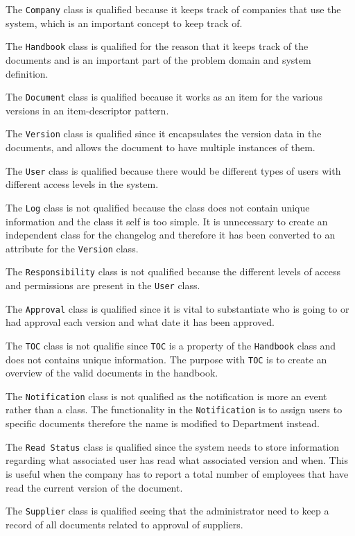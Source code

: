 The \texttt{Company} class is qualified because it keeps track of companies that use the system, which is an important concept to keep track of.

The \texttt{Handbook} class is qualified for the reason that it keeps track of the documents and is an important part of the problem domain and system definition.

The \texttt{Document} class is qualified because it works as an item for the various versions in an item-descriptor pattern.

The \texttt{Version} class is qualified since it encapsulates the version data in the documents, and allows the document to have multiple instances of them.

The \texttt{User} class is qualified because there would be different types of users with different access levels in the system.

The \texttt{Log} class is not qualified because the class does not contain unique information and the class it self is too simple.
It is unnecessary to create an independent class for the changelog and therefore it has been converted to an attribute for the \texttt{Version} class.

The \texttt{Responsibility} class is not qualified because the different levels of access and permissions are present in the \texttt{User} class.

The \texttt{Approval} class is qualified since it is vital to substantiate who is going to or had approval each version and what date it has been approved.

The \texttt{TOC} class is not qualifie since \texttt{TOC} is a property of the \texttt{Handbook} class and does not contains unique information.
The purpose with \texttt{TOC} is to create an overview of the valid documents in the handbook.

The \texttt{Notification} class is not qualified as the notification is more an event rather than a class.
The functionality in the \texttt{Notification} is to assign users to specific documents therefore the name is modified to Department instead.

The \texttt{Read Status} class is qualified since the system needs to store information regarding what associated user has read what associated version and when.
This is useful when the company has to report a total number of employees that have read the current version of the document.

The \texttt{Supplier} class is qualified seeing that the administrator need to keep a record of all documents related to approval of suppliers. %

